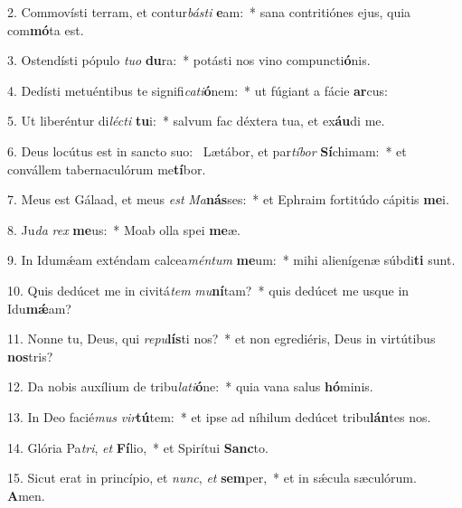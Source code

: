 2. Commovísti terram, et contur\textit{bás}\textit{ti} \textbf{e}am:~*  sana contritiónes ejus, quia com\textbf{mó}ta est.\

3. Ostendísti pópulo \textit{tu}\textit{o} \textbf{du}ra:~*  potásti nos vino compuncti\textbf{ó}nis.\

4. Dedísti metuéntibus te signifi\textit{ca}\textit{ti}\textbf{ó}nem:~*  ut fúgiant a fácie \textbf{ar}cus:\

5. Ut liberéntur di\textit{léc}\textit{ti} \textbf{tu}i:~*  salvum fac déxtera tua, et ex\textbf{áu}di me.\

6. Deus locútus est in sancto suo: \dag\  Lætábor, et par\textit{tí}\textit{bor} \textbf{Sí}chimam:~*  et convállem tabernaculórum me\textbf{tí}bor.\

7. Meus est Gálaad, et meus \textit{est} \textit{Ma}\textbf{nás}ses:~*  et Ephraim fortitúdo cápitis \textbf{me}i.\

8. Ju\textit{da} \textit{rex} \textbf{me}us:~*  Moab olla spei \textbf{me}æ.\

9. In Idumǽam exténdam calcea\textit{mén}\textit{tum} \textbf{me}um:~*  mihi alienígenæ súbdi\textbf{ti} sunt.\

10. Quis dedúcet me in civitá\textit{tem} \textit{mu}\textbf{ní}tam?~*  quis dedúcet me usque in Idu\textbf{mǽ}am?\

11. Nonne tu, Deus, qui \textit{re}\textit{pu}\textbf{lís}ti nos?~*  et non egrediéris, Deus in virtútibus \textbf{nos}tris?\

12. Da nobis auxílium de tribu\textit{la}\textit{ti}\textbf{ó}ne:~*  quia vana salus \textbf{hó}minis.\

13. In Deo facié\textit{mus} \textit{vir}\textbf{tú}tem:~*  et ipse ad níhilum dedúcet tribu\textbf{lán}tes nos.\

14. Glória Pa\textit{tri}, \textit{et} \textbf{Fí}lio,~*  et Spirítui \textbf{Sanc}to.\

15. Sicut erat in princípio, et \textit{nunc}, \textit{et} \textbf{sem}per,~*  et in sǽcula sæculórum. \textbf{A}men.\


